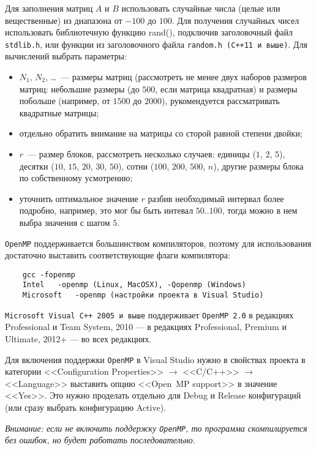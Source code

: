 Для заполнения матриц $A$ и $B$ использовать случайные числа (целые или вещественные) из диапазона от $-100$ до $100$.
Для получения случайных чисел использовать библиотечную функцию rand(), подключив заголовочный файл \texttt{stdlib.h}, или функции из заголовочного файла \texttt{random.h (С++11 и выше)}.
Для вычислений выбрать параметры:
\begin{itemize}
    \item $N_1$, $N_2$, \ldots~--- размеры матриц (рассмотреть не менее двух наборов размеров матриц: небольшие размеры (до $500$, если матрица квадратная) и размеры побольше (например, от $1500$ до $2000$),  рукомендуется рассматривать квадратные матрицы;
    \item отдельно обратить внимание на матрицы со сторой равной степени двойки;
    \item $r$~--- размер блоков, рассмотреть несколько случаев: единицы ($1$, $2$, $5$), десятки ($10$, $15$, $20$, $30$, $50$), сотни ($100$, $200$, $500$, $n$), другие размеры блока по собственному усмотрению;
    \item уточнить оптимальное значение $r$ разбив необходимый интервал более подробно, например, это мог бы быть интевал $50$..$100$, тогда можно в нем выбра значения с шагом $5$.
\end{itemize}

\texttt{OpenMP} поддерживается большинством компиляторов, поэтому для использования достаточно выставить соответствующие флаги компилятора:
\begin{verbatim}
    gcc -fopenmp
    Intel   -openmp (Linux, MacOSX), -Qopenmp (Windows)
    Microsoft   -openmp (настройки проекта в Visual Studio)
\end{verbatim}

\texttt{Microsoft Visual C++ 2005 и выше} поддерживает \texttt{OpenMP 2.0} в редакциях Professional и Team System, 2010 — в редакциях Professional, Premium и Ultimate, 2012+ — во всех редакциях.

Для включения поддержки \texttt{OpenMP} в Visual Studio нужно в свойствах проекта в категории <<Configuration Properties>> $\longrightarrow$ <<C/C++>> $\longrightarrow$ <<Language>> выставить опцию <<Open~MP support>> в значение <<Yes>>. Это нужно проделать отдельно для Debug и Release конфигураций (или сразу выбрать конфигурацию Active).

\textit{Внимание: если не включить поддержку \texttt{OpenMP}, то программа скомпилируется без ошибок, но будет работать последовательно.}

